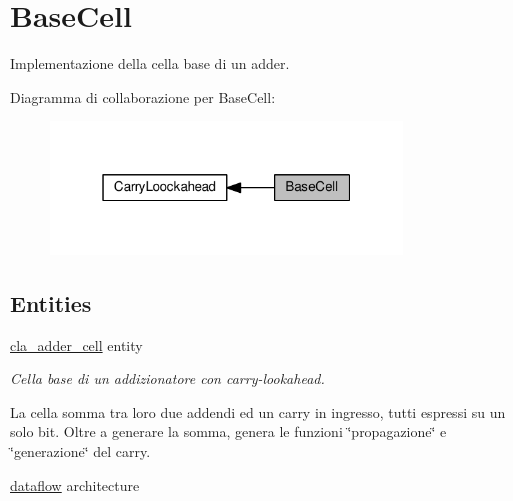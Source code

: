 \hypertarget{group___base_cell}{}\section{Base\+Cell}
\label{group___base_cell}


Implementazione della cella base di un adder.  


Diagramma di collaborazione per Base\+Cell\+:\nopagebreak
\begin{figure}[H]
\begin{center}
\leavevmode
\includegraphics[width=265pt]{group___base_cell}
\end{center}
\end{figure}
\subsection*{Entities}
\begin{DoxyCompactItemize}
\item 
\hyperlink{classcla__adder__cell}{cla\+\_\+adder\+\_\+cell} entity
\begin{DoxyCompactList}\small\item\em Cella base di un addizionatore con carry-\/lookahead.

La cella somma tra loro due addendi ed un carry in ingresso, tutti espressi su un solo bit. Oltre a generare la somma, genera le funzioni \char`\"{}propagazione\char`\"{} e \char`\"{}generazione\char`\"{} del carry. \end{DoxyCompactList}\item 
\hyperlink{classcla__adder__cell_1_1dataflow}{dataflow} architecture
\end{DoxyCompactItemize}
